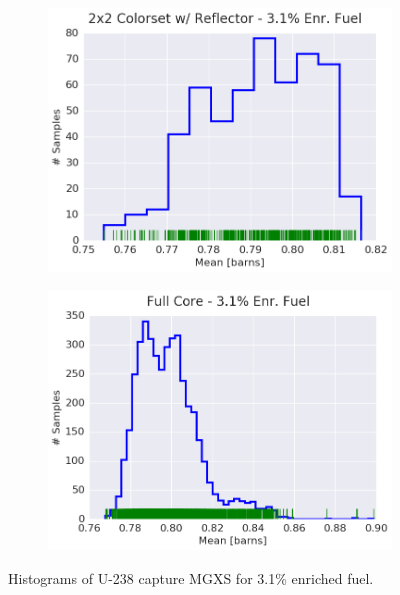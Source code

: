 \begin{figure}[h!]
\begin{subfigure}{0.5\textwidth}
  \includegraphics[width=\linewidth]{figures/patterns/reflector/hist-kde-rug/31-enr-capt-1}  \caption{}
  \label{fig:chap9-hist-reflector-3.1-capt}
\end{subfigure}%
\begin{subfigure}{0.5\textwidth}
  \centering
  \includegraphics[width=\linewidth]{figures/patterns/full-core/hist-kde-rug/31-enr-capt-1} \caption{}
  \label{fig:chap9-hist-full-core-3.1-capt}
\end{subfigure}
\caption[Histogram of U-238 capture MGXS for 3.1\% enriched fuel]{Histograms of U-238 capture \ac{MGXS} for 3.1\% enriched fuel.}
\label{fig:chap9-hist-3.1-capt}
\end{figure}

